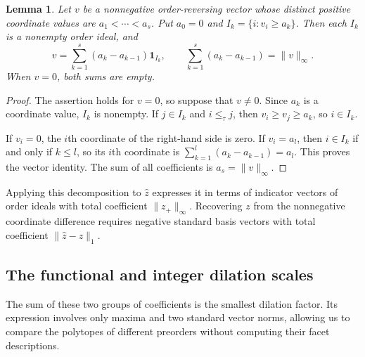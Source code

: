 \documentclass[11pt,reqno]{amsart}
\numberwithin{equation}{section}
\newtheorem{lemma}[theorem]{Lemma}
\theoremstyle{definition}
\theoremstyle{remark}
\theoremstyle{definition}
\begin{document}
\begin{lemma}\label{levels}
Let $v$ be a nonnegative order-reversing vector whose distinct positive coordinate values are $a_1<\cdots<a_s$. Put $a_0=0$ and $I_k=\{i:v_i\ge a_k\}$. Then each $I_k$ is a nonempty order ideal, and
\begin{equation}\label{leveldecomposition}
 v=\sum_{k=1}^s(a_k-a_{k-1})\mathbf1_{I_k},
 \qquad \sum_{k=1}^s(a_k-a_{k-1})=\|v\|_\infty.
\end{equation}
When $v=0$, both sums are empty.
\end{lemma}
\begin{proof}
The assertion holds for $v=0$, so suppose that $v\ne0$. Since $a_k$ is a coordinate value, $I_k$ is nonempty. If $j\in I_k$ and $i\le_\tau j$, then $v_i\ge v_j\ge a_k$, so $i\in I_k$.

If $v_i=0$, the $i$th coordinate of the right-hand side is zero. If $v_i=a_l$, then $i\in I_k$ if and only if $k\le l$, so its $i$th coordinate is
$\sum_{k=1}^l(a_k-a_{k-1})=a_l$. This proves the vector identity. The sum of all coefficients is $a_s=\|v\|_\infty$.
\end{proof}
Applying this decomposition to $\widehat z$ expresses it in terms of indicator vectors of order ideals with total coefficient $\|z_+\|_\infty$. Recovering $z$ from the nonnegative coordinate difference requires negative standard basis vectors with total coefficient $\|\widehat z-z\|_1$.

\subsection{The functional and integer dilation scales}
The sum of these two groups of coefficients is the smallest dilation factor. Its expression involves only maxima and two standard vector norms, allowing us to compare the polytopes of different preorders without computing their facet descriptions.
\end{document}

